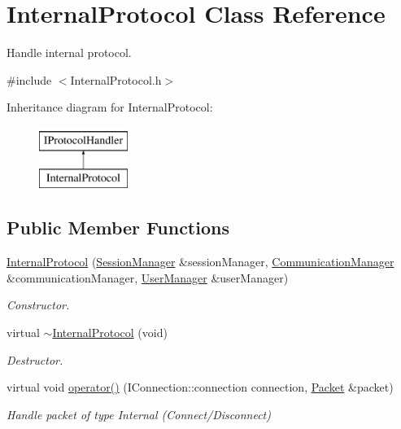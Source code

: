 \hypertarget{class_internal_protocol}{\section{Internal\-Protocol Class Reference}
\label{class_internal_protocol}
}


Handle internal protocol.  




{\ttfamily \#include $<$Internal\-Protocol.\-h$>$}

Inheritance diagram for Internal\-Protocol\-:\begin{figure}[H]
\begin{center}
\leavevmode
\includegraphics[height=2.000000cm]{class_internal_protocol}
\end{center}
\end{figure}
\subsection*{Public Member Functions}
\begin{DoxyCompactItemize}
\item 
\hyperlink{class_internal_protocol_a2634fccf334cbf2b6b504ddc4dfbb1c4}{Internal\-Protocol} (\hyperlink{class_session_manager}{Session\-Manager} \&session\-Manager, \hyperlink{class_communication_manager}{Communication\-Manager} \&communication\-Manager, \hyperlink{class_user_manager}{User\-Manager} \&user\-Manager)
\begin{DoxyCompactList}\small\item\em Constructor. \end{DoxyCompactList}\item 
\hypertarget{class_internal_protocol_a1f504e62a129e7a157dded749436252d}{virtual \hyperlink{class_internal_protocol_a1f504e62a129e7a157dded749436252d}{$\sim$\-Internal\-Protocol} (void)}\label{class_internal_protocol_a1f504e62a129e7a157dded749436252d}

\begin{DoxyCompactList}\small\item\em Destructor. \end{DoxyCompactList}\item 
virtual void \hyperlink{class_internal_protocol_acce8217bd72e8236a3dbc7f9245b71e0}{operator()} (I\-Connection\-::connection connection, \hyperlink{class_packet}{Packet} \&packet)
\begin{DoxyCompactList}\small\item\em Handle packet of type Internal (Connect/\-Disconnect) \end{DoxyCompactList}\end{DoxyCompactItemize}


